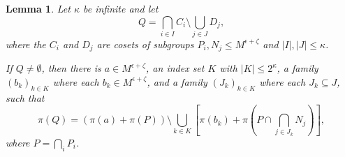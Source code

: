 \documentclass[10pt,a4paper]{amsart}
\newtheorem{lemma}{Lemma}
\begin{document}
\begin{lemma}
\label{lem:proj-atom}
    Let $\kappa$ be infinite and let 
    \[ Q = \bigcap_{i \in I} C_i \setminus \bigcup_{j \in J} D_j, \]
    where the $C_i$ and $D_j$ are cosets of subgroups $P_i, N_j \leq M^{\epsilon+ \zeta}$ and $|I|, |J| \leq \kappa$.
    
    If $Q \neq \emptyset$, then there is $a \in M^{\epsilon + \zeta}$, an index set $K$ with $|K| \leq 2^\kappa$, a family $(b_k)_{k \in K}$ where each $b_k \in M^{\epsilon + \zeta}$, and a family $(J_k)_{k \in K}$ where each $J_k \subseteq J$, such that 
    \[ 
        \pi(Q) = \left( \pi(a) + \pi(P) \right) \setminus \bigcup_{k \in K}  \left[ \pi(b_k) + \pi \left( P \cap \bigcap_{j \in J_k} N_j \right) \right],
    \]
    where $P = \bigcap_i P_i$.
\end{lemma}
\end{document}
